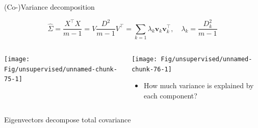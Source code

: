 \documentclass[
  ignorenonframetext,
  aspectratio=169]{beamer}
\providecommand{\tightlist}{%
  \setlength{\itemsep}{0pt}\setlength{\parskip}{0pt}}
\begin{document}
\begin{frame}{(Co-)Variance decomposition}
\protect\hypertarget{co-variance-decomposition-1}{}
\scriptsize

\normalsize

\[\hat{\Sigma} = \frac{X^{\top}X}{m-1} = V \frac{D^{2}}{m-1} V^{\top} = \sum_{k=1} \lambda_{k} \mathbf{v}_{k} \mathbf{v}_{k}^{\top},\quad \lambda_{k}=\frac{D_{k}^{2}}{m-1}\]

\begin{columns}[T]
\begin{column}{.28\textwidth}
\scriptsize

\begin{center}\texttt{[image: Fig/unsupervised/unnamed-chunk-75-1]} \end{center}

\normalsize
\end{column}

\begin{column}{.75\textwidth}
\scriptsize

\begin{center}\texttt{[image: Fig/unsupervised/unnamed-chunk-76-1]} \end{center}

\normalsize

\begin{itemize}
\tightlist
\item
  How much variance is explained by each component?
\end{itemize}
\end{column}
\end{columns}
\end{frame}

\begin{frame}{Eigenvectors decompose total covariance}
\protect\hypertarget{eigenvectors-decompose-total-covariance}{}
\scriptsize


\normalsize

\scriptsize


\normalsize
\end{frame}
\end{document}
